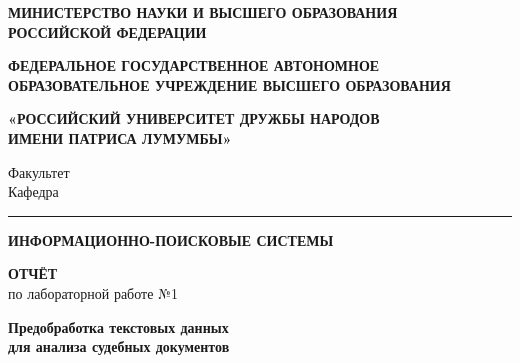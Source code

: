 \documentclass[12pt, a4paper]{report}
\begin{document}
\setcounter{chapter}{0}

\begin{titlepage}
\thispagestyle{empty}
\begin{center}

  {\sffamily\small\bfseries МИНИСТЕРСТВО НАУКИ И ВЫСШЕГО ОБРАЗОВАНИЯ\\
  РОССИЙСКОЙ ФЕДЕРАЦИИ}

  \vspace{6pt}
  {\sffamily\small\bfseries ФЕДЕРАЛЬНОЕ ГОСУДАРСТВЕННОЕ АВТОНОМНОЕ\\
  ОБРАЗОВАТЕЛЬНОЕ УЧРЕЖДЕНИЕ ВЫСШЕГО ОБРАЗОВАНИЯ}

  \vspace{8pt}
  {\sffamily\normalsize\bfseries
  «РОССИЙСКИЙ УНИВЕРСИТЕТ ДРУЖБЫ НАРОДОВ\\
  ИМЕНИ ПАТРИСА ЛУМУМБЫ»}

  \vspace{6pt}
  {\sffamily\small Факультет \underline{\hspace{6cm}}}\\[2pt]
  {\sffamily\small Кафедра \underline{\hspace{7cm}}}

  \vspace{10pt}
  \textcolor{SteelBlue}{\rule{\linewidth}{1pt}}
  \vspace{12pt}

  {\sffamily\Large\bfseries\color{NavyBlue}
  ИНФОРМАЦИОННО-ПОИСКОВЫЕ СИСТЕМЫ}

  \vspace{20pt}

  {\sffamily\LARGE\bfseries ОТЧЁТ}\\[6pt]
  {\sffamily\large по лабораторной работе №1}

  \vspace{12pt}
  \begin{tcolorbox}[infobox, title={}]
    \centering\sffamily\large\bfseries\color{NavyBlue}
    Предобработка текстовых данных\\
    для анализа судебных документов
  \end{tcolorbox}

  \vspace{30pt}

\end{center}


\end{titlepage}
\end{document}
